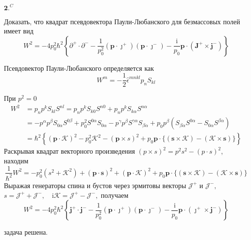 \documentclass[a4paper,12pt]{article} %
\begin{document}
\begin{ttask}$\mathbf{2 .}^{C}$ 

Доказать, что квадрат псевдовектора Паули-Любанского для безмассовых полей имеет вид
$$
W^{2}=-4 p_{0}^{2} \hbar^{2}\left\{
\partial^{+} \cdot \partial^{-}-
\frac{1}{p_{0}^{2}}\left(\boldsymbol{p} \cdot \boldsymbol{\jmath}^{+}\right)\left(\boldsymbol{p} \cdot \boldsymbol{\jmath}^{-}\right)-
\frac{\mathrm{i}}{p_{0}} \boldsymbol{p} \cdot\left(\boldsymbol{J}^{+} \times \boldsymbol{j}^{-}\right)
\right\}$$






Псевдовектор Паули-Любанского определяется как
$$
W^{m}=-\frac{1}{2} \hat{\epsilon}^{m n k l} p_{n} S_{k l}
$$


При $p^{2}=0$
$$
\begin{aligned}
	W^{2} &=
	p_{n} p^{k} S_{k l} S^{n l}=
	p_{n} p^{k} S_{k 0} S^{n 0}
	+
	p_{n} p^{k} S_{k \alpha} S^{n \alpha} 
	\\
	&=-p^{\alpha} p^{\beta} S_{0 \alpha} S^{0 \beta}
	+
	p_{0}^{2} S^{0 \alpha} S_{0 \alpha}
	-
	p^{\gamma} p^{\beta} S^{\gamma \alpha} S_{\beta \alpha}
	+
	p_{0} p^{\beta}\left(S_{\beta \alpha} S^{0 \alpha}-S_{0 \alpha} S^{\beta \alpha}\right) 
	\\
	&=
	\hbar^{2}\left\{
	(\boldsymbol{p} \cdot \mathcal{K})^{2}
	-
	p_{0}^{2} \mathcal{K}^{2}
	-
	(\boldsymbol{p} \times s)^{2}
	+
	p_{0} \boldsymbol{p} \cdot
	\{(\boldsymbol{s} \times \mathcal{K})-(\mathcal{K} \times \boldsymbol{s})\}
	\right\}
\end{aligned}
$$
Раскрывая квадрат векторного произведения $ (p \times s)^{2}=p^{2} s^{2}-(p \cdot s)^{2} $, находим
$$
\frac{1}{\hbar^{2}} W^{2}
=
-p_{0}^{2}\left(s^{2}+\mathcal{K}^{2}\right)
+
(\boldsymbol{p} \cdot \boldsymbol{s})^{2}
+
(\boldsymbol{p} \cdot \boldsymbol{\mathcal { K }})^{2}
+
p_{0} \boldsymbol{p} \cdot\{(\boldsymbol{s} \times \mathcal{K})-(\mathcal{K} \times \boldsymbol{s})\}
$$
Выражая генераторы спина и бустов  через эрмитовы векторы $\mathcal{J}^{+}$ и $\mathcal{J}^{-},$ $ s=\mathcal{J}^{+}+\mathcal{J}^{-}, \quad \mathrm{i} \mathcal{K}=\mathcal{J}^{+}-\mathcal{J}^{-}, $ получаем
$$
W^{2}=-4 p_{0}^{2} \hbar^{2}\left\{
\boldsymbol{j}^{+} \cdot \boldsymbol{j}^{-}-
\frac{1}{p_{0}^{2}}\left(\boldsymbol{p} \cdot \boldsymbol{\jmath}^{+}\right)\left(\boldsymbol{p} \cdot \boldsymbol{\jmath}^{-}\right)-
\frac{\mathrm{i}}{p_{0}} \boldsymbol{p} \cdot\left(\boldsymbol{\jmath}^{+} \times \boldsymbol{j}^{-}\right)
\right\}
$$



задача решена.








\end{ttask}
\end{document}
